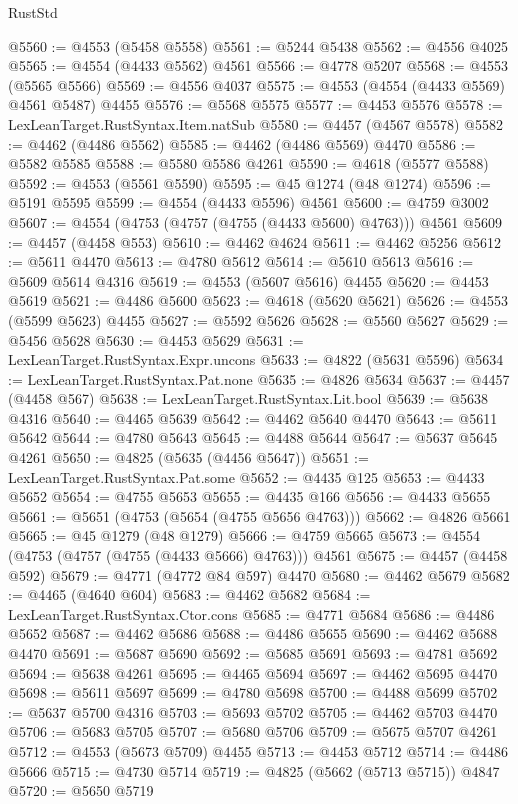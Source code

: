 \begin{lexlean}{RustStd}
\begin{coremodule}
@5560 := @4553 (@5458 @5558)
@5561 := @5244 @5438
@5562 := @4556 @4025
@5565 := @4554 (@4433 @5562) @4561
@5566 := @4778 @5207
@5568 := @4553 (@5565 @5566)
@5569 := @4556 @4037
@5575 := @4553 (@4554 (@4433 @5569) @4561 @5487) @4455
@5576 := @5568 @5575
@5577 := @4453 @5576
@5578 := LexLeanTarget.RustSyntax.Item.natSub
@5580 := @4457 (@4567 @5578)
@5582 := @4462 (@4486 @5562)
@5585 := @4462 (@4486 @5569) @4470
@5586 := @5582 @5585
@5588 := @5580 @5586 @4261
@5590 := @4618 (@5577 @5588)
@5592 := @4553 (@5561 @5590)
@5595 := @45 @1274 (@48 @1274)
@5596 := @5191 @5595
@5599 := @4554 (@4433 @5596) @4561
@5600 := @4759 @3002
@5607 := @4554 (@4753 (@4757 (@4755 (@4433 @5600) @4763))) @4561
@5609 := @4457 (@4458 @553)
@5610 := @4462 @4624
@5611 := @4462 @5256
@5612 := @5611 @4470
@5613 := @4780 @5612
@5614 := @5610 @5613
@5616 := @5609 @5614 @4316
@5619 := @4553 (@5607 @5616) @4455
@5620 := @4453 @5619
@5621 := @4486 @5600
@5623 := @4618 (@5620 @5621)
@5626 := @4553 (@5599 @5623) @4455
@5627 := @5592 @5626
@5628 := @5560 @5627
@5629 := @5456 @5628
@5630 := @4453 @5629
@5631 := LexLeanTarget.RustSyntax.Expr.uncons
@5633 := @4822 (@5631 @5596)
@5634 := LexLeanTarget.RustSyntax.Pat.none
@5635 := @4826 @5634
@5637 := @4457 (@4458 @567)
@5638 := LexLeanTarget.RustSyntax.Lit.bool
@5639 := @5638 @4316
@5640 := @4465 @5639
@5642 := @4462 @5640 @4470
@5643 := @5611 @5642
@5644 := @4780 @5643
@5645 := @4488 @5644
@5647 := @5637 @5645 @4261
@5650 := @4825 (@5635 (@4456 @5647))
@5651 := LexLeanTarget.RustSyntax.Pat.some
@5652 := @4435 @125
@5653 := @4433 @5652
@5654 := @4755 @5653
@5655 := @4435 @166
@5656 := @4433 @5655
@5661 := @5651 (@4753 (@5654 (@4755 @5656 @4763)))
@5662 := @4826 @5661
@5665 := @45 @1279 (@48 @1279)
@5666 := @4759 @5665
@5673 := @4554 (@4753 (@4757 (@4755 (@4433 @5666) @4763))) @4561
@5675 := @4457 (@4458 @592)
@5679 := @4771 (@4772 @84 @597) @4470
@5680 := @4462 @5679
@5682 := @4465 (@4640 @604)
@5683 := @4462 @5682
@5684 := LexLeanTarget.RustSyntax.Ctor.cons
@5685 := @4771 @5684
@5686 := @4486 @5652
@5687 := @4462 @5686
@5688 := @4486 @5655
@5690 := @4462 @5688 @4470
@5691 := @5687 @5690
@5692 := @5685 @5691
@5693 := @4781 @5692
@5694 := @5638 @4261
@5695 := @4465 @5694
@5697 := @4462 @5695 @4470
@5698 := @5611 @5697
@5699 := @4780 @5698
@5700 := @4488 @5699
@5702 := @5637 @5700 @4316
@5703 := @5693 @5702
@5705 := @4462 @5703 @4470
@5706 := @5683 @5705
@5707 := @5680 @5706
@5709 := @5675 @5707 @4261
@5712 := @4553 (@5673 @5709) @4455
@5713 := @4453 @5712
@5714 := @4486 @5666
@5715 := @4730 @5714
@5719 := @4825 (@5662 (@5713 @5715)) @4847
@5720 := @5650 @5719

\end{coremodule}
\end{lexlean}
